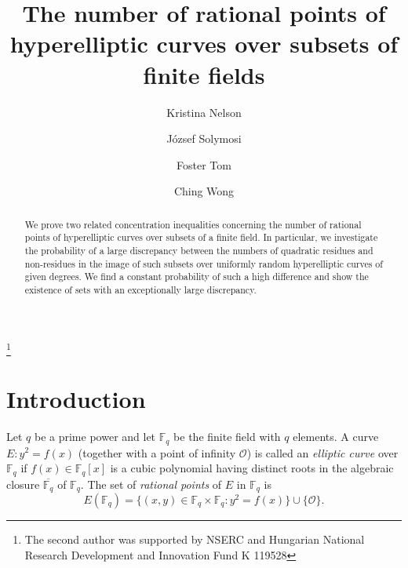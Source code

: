 \documentclass{amsart}
\theoremstyle{plain}
\theoremstyle{definition}
\newcommand{\Fq}{\mathbb{F}_q}
\begin{document}
\title{The number of rational points of hyperelliptic curves over subsets of finite fields}

\author{Kristina Nelson}
\address{\noindent Department of Mathematics, University of California, Berkeley, CA 94720-3840}

\author{J\'{o}zsef Solymosi}
\address{\noindent Department of Mathematics, University of British Columbia, Vancouver, BC, Canada V6T 1Z2}
\thanks{The second author was supported by NSERC and Hungarian National Research Development and Innovation Fund K 119528}

\author{Foster Tom}
\address{\noindent Department of Mathematics, University of British Columbia, Vancouver, BC, Canada V6T 1Z2}

\author{Ching Wong}
\address{\noindent Department of Mathematics, University of British Columbia, Vancouver, BC, Canada V6T 1Z2}


\date{}


\begin{abstract}
We prove two related concentration inequalities concerning the number of rational points of hyperelliptic curves over subsets of a finite field. In particular, we investigate the probability of a large discrepancy between the numbers of quadratic residues and non-residues in the image of such subsets over uniformly random hyperelliptic curves of given degrees. We find a constant probability of such a high difference and show the existence of sets with an exceptionally large discrepancy.
\end{abstract}

\maketitle

\section{Introduction}
Let $q$ be a prime power and let $\Fq$ be the finite field with $q$ elements. A curve $E:y^2=f(x)$ (together with a point of infinity $\mathcal{O}$) is called an \emph{elliptic curve} over $\Fq$ if $f(x)\in\Fq[x]$ is a cubic polynomial having distinct roots in the algebraic closure $\overline{\Fq}$ of $\Fq$. The set of \emph{rational points} of $E$ in $\Fq$ is
\[
E(\Fq)=\{(x,y)\in\Fq\times\Fq:y^2=f(x)\}\cup\{\mathcal{O}\}.
\]
\end{document}
